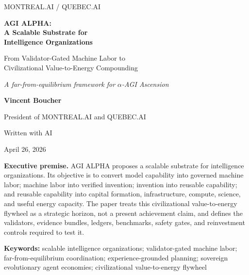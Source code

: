 \documentclass[11pt]{article}
\begin{document}
\begin{titlepage}
\thispagestyle{empty}
\pagecolor{AgiMist}
\vspace*{0.62cm}
\begin{center}
\begin{tcolorbox}[enhanced,width=0.84\textwidth,colback=white,colframe=AgiLine,boxrule=0.55pt,arc=3pt,left=8pt,right=8pt,top=8pt,bottom=8pt]
\centering\Large\textsc{MONTREAL.AI / QUEBEC.AI}
\end{tcolorbox}
\vspace{0.82cm}
\begin{tcolorbox}[enhanced,width=0.94\textwidth,colback=white,colframe=AgiBlue!48,boxrule=0.65pt,arc=4pt,left=14pt,right=14pt,top=14pt,bottom=14pt]
\centering
{\fontsize{28}{33}\selectfont\bfseries\color{AgiBlue} AGI ALPHA:\\[0.18em] A Scalable Substrate for\\[0.18em] Intelligence Organizations\par}
\vspace{0.42cm}
{\Large From Validator-Gated Machine Labor to\\[0.12em] Civilizational Value-to-Energy Compounding\par}
\vspace{0.34cm}
{\normalsize\itshape A far-from-equilibrium framework for $\alpha$-AGI Ascension\par}
\end{tcolorbox}
\vspace{0.68cm}
{\Large\bfseries Vincent Boucher\par}
\vspace{0.12cm}
{\normalsize President of MONTREAL.AI and QUEBEC.AI\par}
{\normalsize Written with AI\par}
\vspace{0.12cm}
{\normalsize April 26, 2026\par}
\vspace{0.58cm}
\begin{executivebox}
\textbf{Executive premise.} AGI ALPHA proposes a scalable substrate for intelligence organizations. Its objective is to convert model capability into governed machine labor; machine labor into verified invention; invention into reusable capability; and reusable capability into capital formation, infrastructure, compute, science, and useful energy capacity. The paper treats this civilizational value-to-energy flywheel as a strategic horizon, not a present achievement claim, and defines the validators, evidence bundles, ledgers, benchmarks, safety gates, and reinvestment controls required to test it.
\end{executivebox}
\vfill
\begin{goldbox}
\centering\small\textbf{Keywords:} scalable intelligence organizations; validator-gated machine labor; far-from-equilibrium coordination; experience-grounded planning; sovereign evolutionary agent economies; civilizational value-to-energy flywheel
\end{goldbox}
\end{center}
\end{titlepage}
\end{document}
